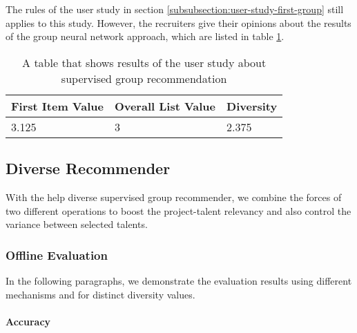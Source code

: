 The rules of the user study in section \ref{subsubsection:user-study-first-group} still applies to this study. However, the recruiters give their opinions about the results of the group neural network approach, which are listed in table \ref{tab:user-study-group-rec-nn}.

\begin{table}[ht]
	\caption[User Study Group Supervised]{A table that shows results of the user study about supervised group recommendation}\label{tab:user-study-group-rec-nn}
	\centering
	\begin{tabular}{l l l}
		\toprule
		First Item Value & Overall List Value & Diversity \\
		\midrule
		3.125 & 3 &  2.375 \\
		\bottomrule
	\end{tabular}
\end{table}


\subsection{Diverse Recommender}

With the help diverse supervised group recommender, we combine the forces of two different operations to boost the project-talent relevancy and also control the variance between selected talents.

\subsubsection{Offline Evaluation}

In the following paragraphs, we demonstrate the evaluation results using different mechanisms and for distinct diversity values.

\paragraph{Accuracy}

